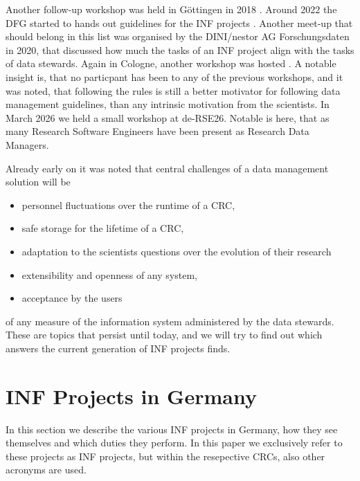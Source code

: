 \documentclass{eceasst}
\begin{document}
Another follow-up workshop was held in Göttingen in 2018 \cite{Roertgen2019}.
Around 2022 the DFG started to hands out guidelines for the INF projects \cite{bastian_2025}.
Another meet-up that should belong in this list was organised by the DINI/nestor AG Forschungsdaten in 2020\cite{Rizzolli_2021},
that discussed how much the tasks of an INF project align with the tasks of data stewards.
Again in Cologne, another workshop was hosted \cite{bastian_2025}. A notable insight is, that no particpant has been to any
of the previous workshops, and it was noted, that following the rules is still a better motivator for following data
management guidelines, than any intrinsic motivation from the scientists.
In March 2026 we held a small workshop at de-RSE26. Notable is here, that as many Research Software Engineers have been present
as Research Data Managers.

Already early on \cite{mueckschel2006} it was noted that central challenges of a data management solution will be
\begin{itemize}
 \item personnel fluctuations over the runtime of a CRC,
 \item safe storage for the lifetime of a CRC,
 \item adaptation to the scientists questions over the evolution of their research
 \item extensibility and openness of any system,
 \item acceptance by the users
\end{itemize}
of any measure of the information system administered by the data stewards.
These are topics that persist until today,
and we will try to find out which answers the current generation of INF projects finds.


\section{INF Projects in Germany}
In this section we describe the various INF projects in Germany, how they see themselves and which duties they perform.
In this paper we exclusively refer to these projects as INF projects, but within the resepective CRCs, also other acronyms are used.
\end{document}
